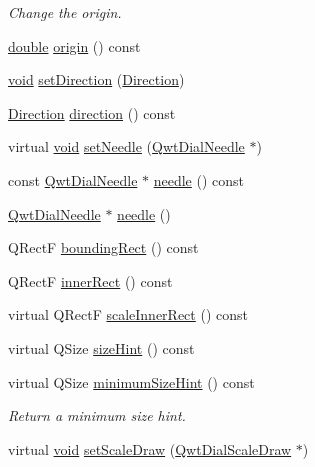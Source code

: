\begin{DoxyCompactItemize}
\begin{DoxyCompactList}\small\item\em Change the origin. \end{DoxyCompactList}\item 
\hyperlink{_super_l_u_support_8h_a8956b2b9f49bf918deed98379d159ca7}{double} \hyperlink{class_qwt_dial_a5d7a8b9094bcc3fb82b31c3ac9ad706d}{origin} () const 
\item 
\hyperlink{group___u_a_v_objects_plugin_ga444cf2ff3f0ecbe028adce838d373f5c}{void} \hyperlink{class_qwt_dial_ae3f7f47ffcfdf37e6b3ff8cb28334981}{set\-Direction} (\hyperlink{class_qwt_dial_af6bee6040f4342d4d60c5e1cf3a06b54}{Direction})
\item 
\hyperlink{class_qwt_dial_af6bee6040f4342d4d60c5e1cf3a06b54}{Direction} \hyperlink{class_qwt_dial_a7502d5cebc37d6a7160b74a6f67dfe55}{direction} () const 
\item 
virtual \hyperlink{group___u_a_v_objects_plugin_ga444cf2ff3f0ecbe028adce838d373f5c}{void} \hyperlink{class_qwt_dial_ac91311f8777eabdbcf6384f308d34a0c}{set\-Needle} (\hyperlink{class_qwt_dial_needle}{Qwt\-Dial\-Needle} $\ast$)
\item 
const \hyperlink{class_qwt_dial_needle}{Qwt\-Dial\-Needle} $\ast$ \hyperlink{class_qwt_dial_a58ed8cf5aae56c44427b25f691f69b5c}{needle} () const 
\item 
\hyperlink{class_qwt_dial_needle}{Qwt\-Dial\-Needle} $\ast$ \hyperlink{class_qwt_dial_abbf494e72f6244e4ec88211354c739a4}{needle} ()
\item 
Q\-Rect\-F \hyperlink{class_qwt_dial_a6181650648d0f99a130f9c4937c6db6b}{bounding\-Rect} () const 
\item 
Q\-Rect\-F \hyperlink{class_qwt_dial_a8052114c649668ecee6ae628b013a489}{inner\-Rect} () const 
\item 
virtual Q\-Rect\-F \hyperlink{class_qwt_dial_add3ff98b9efc5dbf4fdc04aee68fe40a}{scale\-Inner\-Rect} () const 
\item 
virtual Q\-Size \hyperlink{class_qwt_dial_a7d79a5c1cbaadb1ded9306044fa2a4a1}{size\-Hint} () const 
\item 
virtual Q\-Size \hyperlink{class_qwt_dial_a21e46fa17a55b938c027ec7b4b97d157}{minimum\-Size\-Hint} () const 
\begin{DoxyCompactList}\small\item\em Return a minimum size hint. \end{DoxyCompactList}\item 
virtual \hyperlink{group___u_a_v_objects_plugin_ga444cf2ff3f0ecbe028adce838d373f5c}{void} \hyperlink{class_qwt_dial_a30828ff36faf4f4e6f55dae4bf1b84b2}{set\-Scale\-Draw} (\hyperlink{class_qwt_dial_scale_draw}{Qwt\-Dial\-Scale\-Draw} $\ast$)

\end{DoxyCompactItemize}
